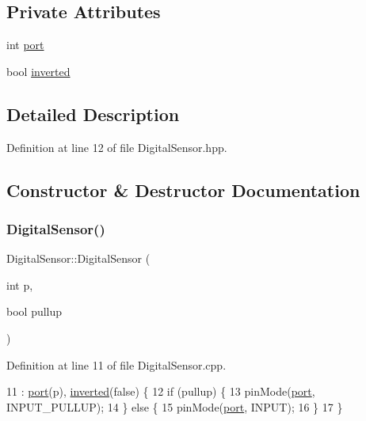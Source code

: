 \subsection*{Private Attributes}
\begin{DoxyCompactItemize}
\item 
int \hyperlink{class_digital_sensor_a5d6d5b9d33670b7f2d8b745b175ce023}{port}
\item 
bool \hyperlink{class_digital_sensor_a0458d9c3e2f781a776742a080d7b7e81}{inverted}
\end{DoxyCompactItemize}


\subsection{Detailed Description}


Definition at line 12 of file Digital\+Sensor.\+hpp.



\subsection{Constructor \& Destructor Documentation}
\mbox{\label{class_digital_sensor_a79aab132baece8ea00664aa75be64b84}} 
\subsubsection{\texorpdfstring{Digital\+Sensor()}{DigitalSensor()}\hspace{0.1cm}{\footnotesize\ttfamily [1/2]}}
{\footnotesize\ttfamily Digital\+Sensor\+::\+Digital\+Sensor (\begin{DoxyParamCaption}\item[{int}]{p,  }\item[{bool}]{pullup }\end{DoxyParamCaption})}



Definition at line 11 of file Digital\+Sensor.\+cpp.


\begin{DoxyCode}
11                                                : \hyperlink{class_digital_sensor_a5d6d5b9d33670b7f2d8b745b175ce023}{port}(p), \hyperlink{class_digital_sensor_a0458d9c3e2f781a776742a080d7b7e81}{inverted}(\textcolor{keyword}{false}) \{
12     \textcolor{keywordflow}{if} (pullup) \{
13         pinMode(\hyperlink{class_digital_sensor_a5d6d5b9d33670b7f2d8b745b175ce023}{port}, INPUT\_PULLUP);
14     \} \textcolor{keywordflow}{else} \{
15         pinMode(\hyperlink{class_digital_sensor_a5d6d5b9d33670b7f2d8b745b175ce023}{port}, INPUT);
16     \}
17 \}
\end{DoxyCode}
\mbox{\label{class_digital_sensor_a98182af6590bee5570857439b7fda908}} 
